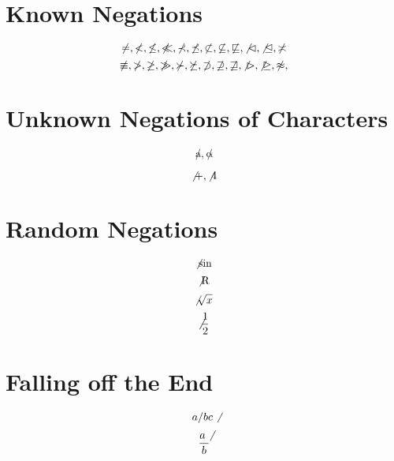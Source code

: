 \documentclass{article}
\begin{document}
\section{Known Negations}

\[ \not=, \not<,\not\le,\not\ll,
   \not\prec,\not\preceq,
   \not\subset,\not\subseteq,\not\sqsubseteq,
   \not\lhd,\not\unlhd,
   \not\asymp \]
\[ \not\equiv, \not>,\not\ge,\not\gg,
   \not\succ,\not\succeq,
   \not\supset,\not\supseteq,\not\sqsupseteq,
   \not\rhd,\not\unrhd,
   \not\approx, \]

\section{Unknown Negations of Characters}

\[ \not a,  \not\alpha \]

\[ \not+, \not 4 \]

\section{Random Negations}

\[ \not\sin \]
\[ \not\operatorname{R} \]
\[ \not\sqrt{x} \]
\[ \not\frac{1}{2} \]

\section{Falling off the End}
\[ a/b c \not \]
\[ \frac{a\not}{b} \]
\end{document}
